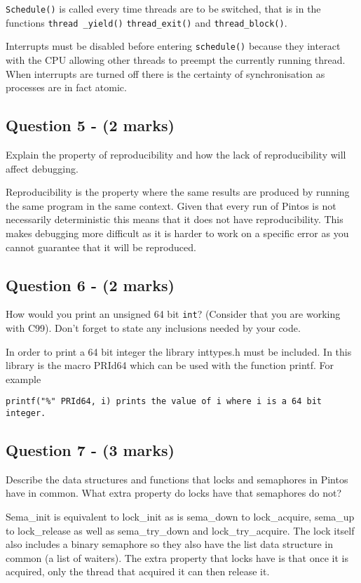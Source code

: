 \documentclass[a4paper,12pt]{article}
\begin{document}
\texttt{Schedule()} is called every time threads are to be switched, that is in the functions \texttt{thread _yield()} \texttt{thread_exit()} and \texttt{thread_block()}.

Interrupts must be disabled before entering \texttt{schedule()} because they interact with the CPU allowing other threads to preempt the currently running thread. When interrupts are turned off there is the certainty of synchronisation as processes are in fact atomic.\\

\subsection*{Question 5 - (2 marks)}
Explain the property of reproducibility and how the lack of reproducibility will affect debugging.

Reproducibility is the property where the same results are produced by running the same program in the same context. Given that every run of Pintos is not necessarily deterministic this means that it does not have reproducibility. This makes debugging more difficult as it is harder to work on a specific error as you cannot guarantee that it will be reproduced.\\

\subsection*{Question 6 - (2 marks)}
How would you print an unsigned 64 bit \texttt{int}? 
(Consider that you are working with C99). 
Don't forget to state any inclusions needed by your code.

In order to print a 64 bit integer the library inttypes.h must be included. In this library is the macro PRId64 which can be used with the function printf. For example
	
\begin{verbatim}
printf("%" PRId64, i) prints the value of i where i is a 64 bit integer.
\end{verbatim}


\subsection*{Question 7 - (3 marks)}
Describe the data structures and functions that locks and semaphores in Pintos have in common. 
What extra property do locks have that semaphores do not?

Sema_init is equivalent to lock_init as is sema_down to lock_acquire, sema_up to lock_release as well as sema_try_down and lock_try_acquire. The lock itself also includes a binary semaphore so they also have the list data structure in common (a list of waiters).
The extra property that locks have is that once it is acquired, only the thread that acquired it can then release it. \\
\end{document}
